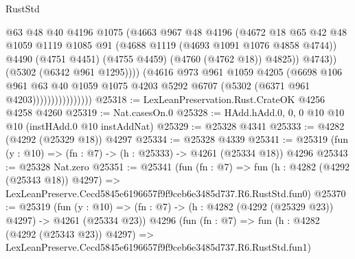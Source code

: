 \begin{lexlean}{RustStd}
\begin{coremodule}
                                    @63
                                    @48
                                    @40
                                    @4196
                                    @1075
                                    (@4663
                                      @967
                                      @48
                                      @4196
                                      (@4672
                                        @18
                                        @65
                                        @42
                                        @48
                                        @1059
                                        @1119
                                        @1085
                                        @91
                                        (@4688 @1119 (@4693 @1091 @1076 @4858 @4744))
                                        @4490
                                        (@4751 @4451)
                                        (@4755 @4459)
                                        (@4760 (@4762 @18))
                                        @4825))
                                    @4743))
                                (@5302 (@6342 @961 @1295))))
                            (@4616
                              @973
                              @961
                              @1059
                              @4205
                              (@6698
                                @106
                                @961
                                @63
                                @40
                                @1059
                                @1075
                                @4203
                                @5292
                                @6707
                                (@5302 (@6371 @961 @4203))))))))))))))))
@25318 := LexLeanPreservation.Rust.CrateOK @4256 @4258 @4260
@25319 := Nat.casesOn.{0}
@25328 := HAdd.hAdd.{0, 0, 0} @10 @10 @10 (instHAdd.{0} @10 instAddNat)
@25329 := @25328 @4341
@25333 := @4282 (@4292 (@25329 @18)) @4297
@25334 := @25328 @4339
@25341 := @25319 (fun (y : @10) => (fn : @7) -> (h : @25333) -> @4261 (@25334 @18)) @4296
@25343 := @25328 Nat.zero
@25351 := @25341
    (fun (fn : @7) =>
    fun (h : @4282 (@4292 (@25343 @18)) @4297) =>
    LexLeanPreserve.Cecd5845e6196657f9f9ceb6e3485d737.R6.RustStd.fun0)
@25370 := @25319
    (fun (y : @10) => (fn : @7) -> (h : @4282 (@4292 (@25329 @23)) @4297) -> @4261 (@25334 @23))
    @4296
    (fun (fn : @7) =>
    fun (h : @4282 (@4292 (@25343 @23)) @4297) =>
    LexLeanPreserve.Cecd5845e6196657f9f9ceb6e3485d737.R6.RustStd.fun1)

\end{coremodule}
\end{lexlean}
